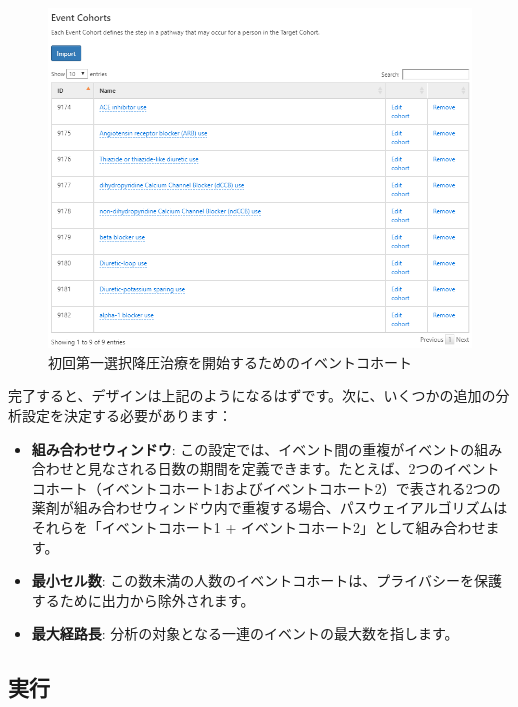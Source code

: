\documentclass[
  11pt]{book}
\providecommand{\tightlist}{%
  \setlength{\itemsep}{0pt}\setlength{\parskip}{0pt}}
\theoremstyle{definition}
\theoremstyle{definition}
\theoremstyle{definition}
\theoremstyle{definition}
\theoremstyle{remark}
\begin{document}
\begin{figure}

{\centering \includegraphics[width=1\linewidth]{images/Characterization/atlasPathwaysEventCohorts} 

}

\caption{初回第一選択降圧治療を開始するためのイベントコホート}\label{fig:atlasPathwaysEventCohorts}
\end{figure}

完了すると、デザインは上記のようになるはずです。次に、いくつかの追加の分析設定を決定する必要があります：

\begin{itemize}
\tightlist
\item
  \textbf{組み合わせウィンドウ}: この設定では、イベント間の重複がイベントの組み合わせと見なされる日数の期間を定義できます。たとえば、2つのイベントコホート（イベントコホート1およびイベントコホート2）で表される2つの薬剤が組み合わせウィンドウ内で重複する場合、パスウェイアルゴリズムはそれらを「イベントコホート1 + イベントコホート2」として組み合わせます。
\item
  \textbf{最小セル数}: この数未満の人数のイベントコホートは、プライバシーを保護するために出力から除外されます。
\item
  \textbf{最大経路長}: 分析の対象となる一連のイベントの最大数を指します。
\end{itemize}

\subsection{実行}\label{ux5b9fux884c-1}
\end{document}
